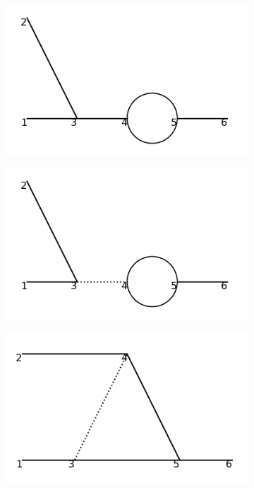 \documentclass[11pt,a4paper,twoside,pdf]{article}
\numberwithin{equation}{section}
\begin{document}
\begin{figure}[h!]
\begin{subfigure}[t]{0.24\textwidth}
    \end{subfigure}
    \hfill
    \begin{subfigure}[t]{0.24\textwidth}
        \centering
        \includegraphics[width=\textwidth]{plots/order3/order3_1to2/3.png}
        \caption{ }
    \end{subfigure}
    \hfill
    \begin{subfigure}[t]{0.24\textwidth}
        \centering
        \includegraphics[width=\textwidth]{plots/order3/order3_1to2/4.png}
        \caption{ }
    \end{subfigure}
    \hfill
    \begin{subfigure}[t]{0.24\textwidth}
        \centering
        \includegraphics[width=\textwidth]{plots/order3/order3_1to2/5.png}

\end{subfigure}
\end{figure}
\end{document}
